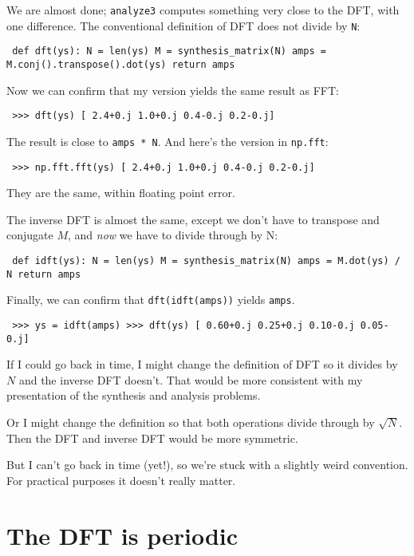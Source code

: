 \documentclass[12pt]{book} \usepackage[width=5.5in,height=8.5in, hmarginratio=3:2,vmarginratio=1:1]{geometry}
\begin{document}
We are almost done; {\tt analyze3} computes something very close to the DFT, with one difference. The conventional definition of DFT does not divide by {\tt N}: 

\begin{verbatim} def dft(ys): N = len(ys) M = synthesis_matrix(N) amps = M.conj().transpose().dot(ys) return amps \end{verbatim} 

Now we can confirm that my version yields the same result as FFT: 

\begin{verbatim} >>> dft(ys) [ 2.4+0.j 1.0+0.j 0.4-0.j 0.2-0.j] \end{verbatim} 

The result is close to {\tt amps * N}. And here's the version in {\tt np.fft}: 

\begin{verbatim} >>> np.fft.fft(ys) [ 2.4+0.j 1.0+0.j 0.4-0.j 0.2-0.j] \end{verbatim} 

They are the same, within floating point error. 

The inverse DFT is almost the same, except we don't have to transpose and conjugate $M$, and {\em now} we have to divide through by N: 

\begin{verbatim} def idft(ys): N = len(ys) M = synthesis_matrix(N) amps = M.dot(ys) / N return amps \end{verbatim} 

Finally, we can confirm that {\tt dft(idft(amps))} yields {\tt amps}. 

\begin{verbatim} >>> ys = idft(amps) >>> dft(ys) [ 0.60+0.j 0.25+0.j 0.10-0.j 0.05-0.j] \end{verbatim} 

If I could go back in time, I might change the definition of DFT so it divides by $N$ and the inverse DFT doesn't. That would be more consistent with my presentation of the synthesis and analysis problems. 

Or I might change the definition so that both operations divide through by $\sqrt{N}$. Then the DFT and inverse DFT would be more symmetric. 

But I can't go back in time (yet!), so we're stuck with a slightly weird convention. For practical purposes it doesn't really matter. 

\section{The DFT is periodic} 
\end{document}
